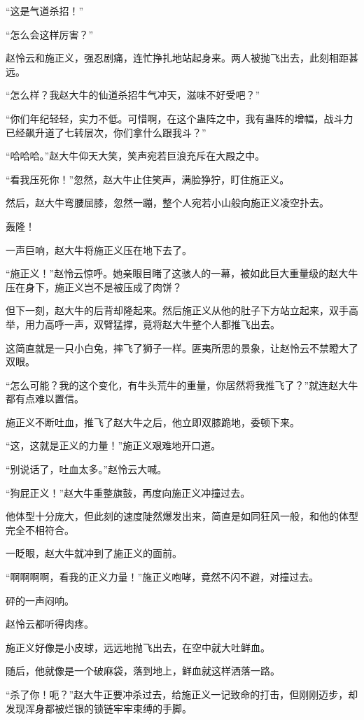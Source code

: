 \begin{this_body}
“这是气道杀招！”

“怎么会这样厉害？”

赵怜云和施正义，强忍剧痛，连忙挣扎地站起身来。两人被抛飞出去，此刻相距甚远。

“怎么样？我赵大牛的仙道杀招牛气冲天，滋味不好受吧？”

“你们年纪轻轻，实力不低。可惜啊，在这个蛊阵之中，我有蛊阵的增幅，战斗力已经飙升道了七转层次，你们拿什么跟我斗？”

“哈哈哈。”赵大牛仰天大笑，笑声宛若巨浪充斥在大殿之中。

“看我压死你！”忽然，赵大牛止住笑声，满脸狰狞，盯住施正义。

然后，赵大牛弯腰屈膝，忽然一蹦，整个人宛若小山般向施正义凌空扑去。

轰隆！

一声巨响，赵大牛将施正义压在地下去了。

“施正义！”赵怜云惊呼。她亲眼目睹了这骇人的一幕，被如此巨大重量级的赵大牛压在身下，施正义岂不是被压成了肉饼？

但下一刻，赵大牛的后背却隆起来。然后施正义从他的肚子下方站立起来，双手高举，用力高呼一声，双臂猛撑，竟将赵大牛整个人都推飞出去。

这简直就是一只小白兔，摔飞了狮子一样。匪夷所思的景象，让赵怜云不禁瞪大了双眼。

“怎么可能？我的这个变化，有牛头荒牛的重量，你居然将我推飞了？”就连赵大牛都有点难以置信。

施正义不断吐血，推飞了赵大牛之后，他立即双膝跪地，委顿下来。

“这，这就是正义的力量！”施正义艰难地开口道。

“别说话了，吐血太多。”赵怜云大喊。

“狗屁正义！”赵大牛重整旗鼓，再度向施正义冲撞过去。

他体型十分庞大，但此刻的速度陡然爆发出来，简直是如同狂风一般，和他的体型完全不相符合。

一眨眼，赵大牛就冲到了施正义的面前。

“啊啊啊啊，看我的正义力量！”施正义咆哮，竟然不闪不避，对撞过去。

砰的一声闷响。

赵怜云都听得肉疼。

施正义好像是小皮球，远远地抛飞出去，在空中就大吐鲜血。

随后，他就像是一个破麻袋，落到地上，鲜血就这样洒落一路。

“杀了你！呃？”赵大牛正要冲杀过去，给施正义一记致命的打击，但刚刚迈步，却发现浑身都被烂银的锁链牢牢束缚的手脚。


\end{this_body}
